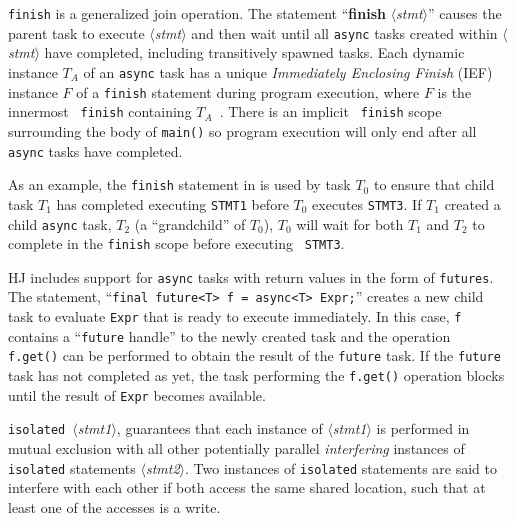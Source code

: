 {\tt finish} is a generalized join operation.  The statement ``{\bf finish} $\langle${\em stmt}$\rangle$'' causes the parent
task to execute {\em $\langle$stmt$\rangle$} and then wait until all
{\tt async} tasks created within {\em $\langle$stmt$\rangle$} have completed,
including transitively spawned tasks. 
Each dynamic instance $T_A$ of an {\tt async} task has a unique {\em
  Immediately Enclosing Finish} (IEF) instance $F$ of a {\tt finish}
statement during program execution, where $F$ is the innermost {\tt
  finish} containing $T_A$~.  There is an implicit {\tt
  finish} scope surrounding the body of {\tt main()} so program
execution will only end after all {\tt async} tasks have completed.

As an example, the {\tt finish} statement in
 is used by task $T_0$ to ensure that
child task $T_1$ has completed executing {\tt STMT1} before $T_0$
executes {\tt STMT3}.  If $T_1$ created a child {\tt async} task,
$T_2$ (a ``grandchild'' of $T_0$), $T_0$ will wait for both $T_1$ and
$T_2$ to complete in the {\tt finish} scope before executing {\tt
  STMT3}.

HJ includes support for {\tt async} tasks with return
values in the form of {\tt futures}. The statement, ``{\tt final future<T> f = async<T> Expr;}''
creates a new child task to evaluate {\tt Expr} that is ready to
execute immediately.  In this case, {\tt f} contains a
``{\tt future} handle'' to the newly created task and the operation {\tt
  f.get()} can be performed to
obtain the result of the {\tt future} task.  If the {\tt future} task has not
completed as yet, the task performing the {\tt f.get()} operation
blocks until the result of {\tt Expr} becomes available.

 {\tt isolated}~$\langle${\it stmt1}$\rangle$, guarantees that each instance of $\langle${\it stmt1}$\rangle$ is performed 
in mutual exclusion with all other potentially parallel {\em interfering} instances of
{\tt isolated} statements $\langle${\it stmt2}$\rangle$.  Two instances of {\tt isolated} statements are said to interfere with each 
other if both access the same shared location, such that at least one of the accesses is a write.  

